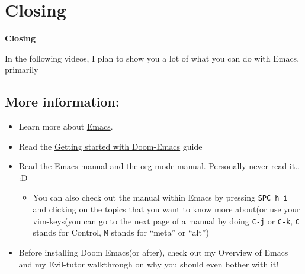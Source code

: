 \documentclass[11pt]{article}
\begin{document}
\section{Closing}
\label{sec:orga763c8c}
\textbf{Closing}

In the following videos, I plan to show you a lot of what you can do with Emacs, primarily
\subsection{More information:}
\label{sec:org0382cf6}
\begin{itemize}
\item Learn more about \href{https://www.gnu.org/software/emacs/}{Emacs}.
\item Read the \href{https://github.com/hlissner/doom-emacs/blob/develop/docs/getting\_started.org}{Getting started with Doom-Emacs} guide
\item Read the \href{https://www.gnu.org/software/emacs/manual/html\_node/emacs/index.html}{Emacs manual} and the \href{https://orgmode.org/manual/index.html}{org-mode manual}. Personally never read it.. :D
\begin{itemize}
\item You can also check out the manual within Emacs by pressing \texttt{SPC h i} and clicking on
the topics that you want to know more about(or use your vim-keys(you can go
to the next page of a manual by doing \texttt{C-j} or \texttt{C-k}, \texttt{C} stands for Control,
\texttt{M} stands for ``meta'' or ``alt'')
\end{itemize}
\item Before installing Doom Emacs(or after), check out my Overview of Emacs and my Evil-tutor
walkthrough on why you should even bother with it!
\end{itemize}
\end{document}
